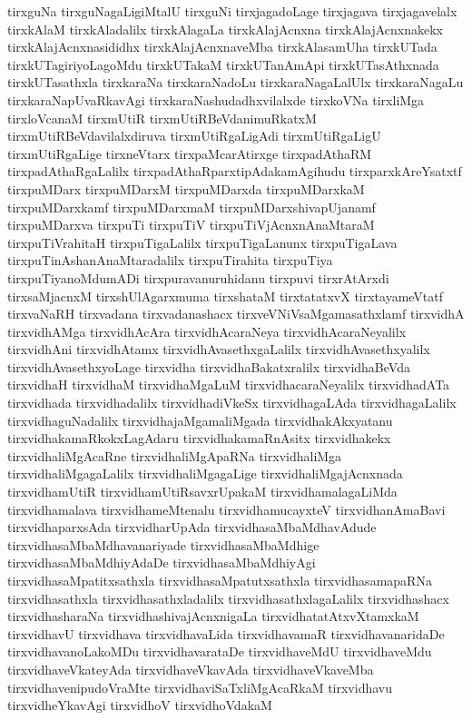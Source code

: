 {tirxguNa
tirxguNagaLigiMtalU
tirxguNi
tirxjagadoLage
tirxjagava
tirxjagavelalx
tirxkAlaM
tirxkAladalilx
tirxkAlagaLa
tirxkAlajAcnxna
tirxkAlajAcnxnakekx
tirxkAlajAcnxnasididhx
tirxkAlajAcnxnaveMba
tirxkAlasamUha
tirxkUTada
tirxkUTagiriyoLagoMdu
tirxkUTakaM
tirxkUTanAmApi
tirxkUTasAthxnada
tirxkUTasathxla
tirxkaraNa
tirxkaraNadoLu
tirxkaraNagaLalUlx
tirxkaraNagaLu
tirxkaraNapUvaRkavAgi
tirxkaraNashudadhxvilalxde
tirxkoVNa
tirxliMga
tirxloVcanaM
tirxmUtiR
tirxmUtiRBeVdanimuRkatxM
tirxmUtiRBeVdavilalxdiruva
tirxmUtiRgaLigAdi
tirxmUtiRgaLigU
tirxmUtiRgaLige
tirxneVtarx
tirxpaMcarAtirxge
tirxpadAthaRM
tirxpadAthaRgaLalilx
tirxpadAthaRparxtipAdakamAgihudu
tirxparxkAreYsatxtf
tirxpuMDarx
tirxpuMDarxM
tirxpuMDarxda
tirxpuMDarxkaM
tirxpuMDarxkamf
tirxpuMDarxmaM
tirxpuMDarxshivapUjanamf
tirxpuMDarxva
tirxpuTi
tirxpuTiV
tirxpuTiVjAcnxnAnaMtaraM
tirxpuTiVrahitaH
tirxpuTigaLalilx
tirxpuTigaLanunx
tirxpuTigaLava
tirxpuTinAshanAnaMtaradalilx
tirxpuTirahita
tirxpuTiya
tirxpuTiyanoMdumADi
tirxpuravanuruhidanu
tirxpuvi
tirxrAtArxdi
tirxsaMjacnxM
tirxshUlAgarxmuma
tirxshataM
tirxtatatxvX
tirxtayameVtatf
tirxvaNaRH
tirxvadana
tirxvadanashacx
tirxveVNiVsaMgamasathxlamf
tirxvidhA
tirxvidhAMga
tirxvidhAcAra
tirxvidhAcaraNeya
tirxvidhAcaraNeyalilx
tirxvidhAni
tirxvidhAtamx
tirxvidhAvasethxgaLalilx
tirxvidhAvasethxyalilx
tirxvidhAvasethxyoLage
tirxvidha
tirxvidhaBakatxralilx
tirxvidhaBeVda
tirxvidhaH
tirxvidhaM
tirxvidhaMgaLuM
tirxvidhacaraNeyalilx
tirxvidhadATa
tirxvidhada
tirxvidhadalilx
tirxvidhadiVkeSx
tirxvidhagaLAda
tirxvidhagaLalilx
tirxvidhaguNadalilx
tirxvidhajaMgamaliMgada
tirxvidhakAkxyatanu
tirxvidhakamaRkokxLagAdaru
tirxvidhakamaRnAsitx
tirxvidhakekx
tirxvidhaliMgAcaRne
tirxvidhaliMgApaRNa
tirxvidhaliMga
tirxvidhaliMgagaLalilx
tirxvidhaliMgagaLige
tirxvidhaliMgajAcnxnada
tirxvidhamUtiR
tirxvidhamUtiRsavxrUpakaM
tirxvidhamalagaLiMda
tirxvidhamalava
tirxvidhameMtenalu
tirxvidhamucayxteV
tirxvidhanAmaBavi
tirxvidhaparxsAda
tirxvidharUpAda
tirxvidhasaMbaMdhavAdude
tirxvidhasaMbaMdhavanariyade
tirxvidhasaMbaMdhige
tirxvidhasaMbaMdhiyAdaDe
tirxvidhasaMbaMdhiyAgi
tirxvidhasaMpatitxsathxla
tirxvidhasaMpatutxsathxla
tirxvidhasamapaRNa
tirxvidhasathxla
tirxvidhasathxladalilx
tirxvidhasathxlagaLalilx
tirxvidhashacx
tirxvidhasharaNa
tirxvidhashivajAcnxnigaLa
tirxvidhatatAtxvXtamxkaM
tirxvidhavU
tirxvidhava
tirxvidhavaLida
tirxvidhavamaR
tirxvidhavanaridaDe
tirxvidhavanoLakoMDu
tirxvidhavarataDe
tirxvidhaveMdU
tirxvidhaveMdu
tirxvidhaveVkateyAda
tirxvidhaveVkavAda
tirxvidhaveVkaveMba
tirxvidhavenipudoVraMte
tirxvidhaviSaTxliMgAcaRkaM
tirxvidhavu
tirxvidheYkavAgi
tirxvidhoV
tirxvidhoVdakaM
}
